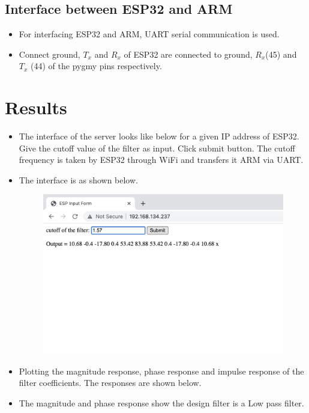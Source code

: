 \documentclass[journal,12pt,twocolumn]{IEEEtran}
\begin{document}
\subsection{Interface between ESP32 and ARM}
\begin{itemize}
\item For interfacing ESP32 and ARM, UART serial communication is used. 
\item Connect ground, $T_x$ and $R_x$ of ESP32 are connected to ground, $R_x$(45) and $T_x$ (44) of the pygmy pins respectively. 
\end{itemize}
\section{Results}
\begin{itemize}
\item The interface of the server looks like below for a given IP address of ESP32. Give the cutoff value of the filter as input. Click submit button. The cutoff frequency is taken by ESP32 through WiFi and transfers it ARM via UART.
\item The interface is as shown below.  
\begin{figure}[H]
	\centering
    \includegraphics[width=\columnwidth]{interface.png}
\end{figure}
\item Plotting the magnitude response, phase response and impulse response of the filter coefficients. The responses are shown below.
\item The magnitude and phase response show the design filter is a Low pass filter. 
\begin{figure}[H]
	\centering

\end{figure}
\end{itemize}
\end{document}

